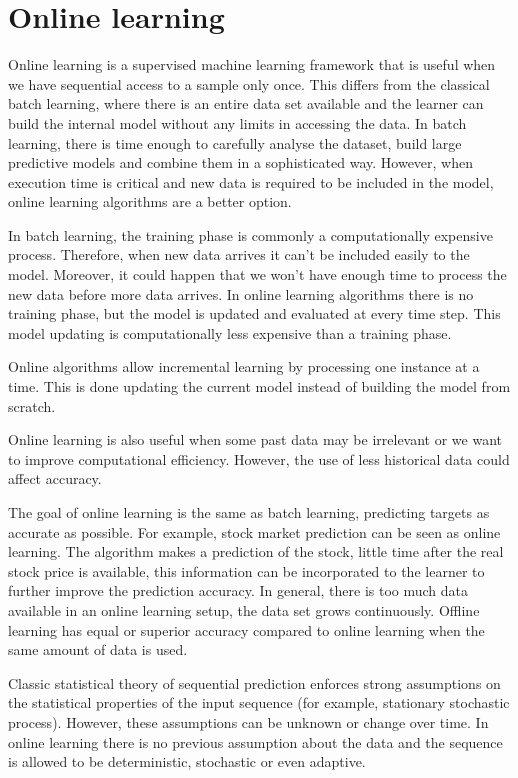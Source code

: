 \section{Online learning} \label{sec:onoffline}

Online learning is a supervised machine learning framework that is useful when
we have sequential access to a sample only once.  This differs from the
classical batch learning, where there is an entire data set available and the
learner can build the internal model without any limits in accessing the data.
In batch learning, there is time enough to carefully analyse the dataset, build
large predictive models and combine them in a sophisticated way. However, when
execution time is critical and new data is required to be included in the model,
online learning algorithms are a better option.

In batch learning, the training phase is commonly a computationally expensive
process. Therefore, when new data arrives it can't be included easily to the
model. Moreover, it could happen that we won't have enough time to process the
new data before more data arrives. In online learning algorithms there is no
training phase, but the model is updated and evaluated at every time step. This
model updating is computationally less expensive than a training phase.



Online algorithms allow incremental learning by processing one instance at a
time. This is done updating the current model instead of building the model from
scratch.

Online learning is also useful when some past data may be irrelevant
or we want to improve computational efficiency. However, the use of less
historical data could affect accuracy.

The goal of online learning is the same as batch learning, predicting targets as
accurate as possible. For example, stock market prediction can be seen as online
learning. The algorithm makes a prediction of the stock, little time after the
real stock price is available, this information can be incorporated to the
learner to further improve the prediction accuracy. In general, there is too
much data available in an online learning setup, the data set grows
continuously. Offline learning has equal or superior accuracy compared to online
learning when the same amount of data is used.

Classic statistical theory of sequential prediction enforces strong assumptions
on the statistical properties of the input sequence (for example, stationary
stochastic process). However, these assumptions can be unknown or change over
time. In online learning there is no previous assumption about the data and the
sequence is allowed to be deterministic, stochastic or even adaptive.  

